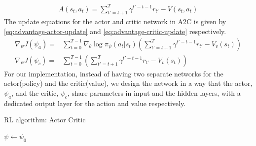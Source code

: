 \begin{align}
\label{eq:advantage-eq}
A(s_{t}, a_{t}) = \sum_{t'=t+1}^{T} \gamma^{t'-t-1} r_{t'} - V(s_{t}, a_{t})
\end{align}
The update equations for the actor and critic network in A2C is given by \autoref{eq:advantage-actor-update} and \autoref{eq:advantage-critic-update} respectively.
\begin{align}
\label{eq:advantage-actor-update}
\nabla_{\psi} J (\psi_{a}) = & \sum_{t=0}^{T-1} \nabla_{\theta}\log \pi_{\psi}(a_{t}|s_{t}) \left(\sum_{t'=t+1}^{T} \gamma^{t'-t-1} r_{t'} - V_{v}(s_{t})\right)\\
\label{eq:advantage-critic-update}
\nabla_{\psi} J (\psi_{c}) = & \sum_{t=0}^{T-1} \left(\sum_{t'=t+1}^{T} \gamma^{t'-t-1} r_{t'} - V_{v}(s_{t})\right)
\end{align} 
For our implementation, instead of having two separate networks for the actor(policy) and the critic(value), we design the network in a way that the actor, $\psi_{a}$, and the critic, $\psi_{c}$, share parameters in input and the hidden layers, with a dedicated output layer for the action and value respectively.

\vfill
\begin{algorithm}[tbhp]
	\caption{RL algorithm: Actor Critic}
	\label{alg:actor-critic}
	
	\BlankLine
	$\psi \gets \psi_0$ \DontPrintSemicolon {} 

	\BlankLine
	
\end{algorithm}


